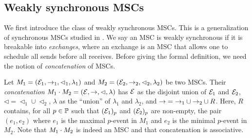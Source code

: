 




\subsection{Weakly synchronous MSCs}

We first introduce the class of weakly synchronous MSCs. This is a generalization of synchronous MSCs studied in \cite{DBLP:conf/cav/BouajjaniEJQ18, DBLP:conf/fossacs/GiustoLL20}. We say an MSC is weakly synchronous if it is breakable into \emph{exchanges}, where an exchange is an MSC that allows one to schedule all sends before all receives. Before giving the formal definition, we need the notion of \emph{concatenation} of MSCs.

Let $M_1 = (\mathcal{E}_1,\to_1,\lhd_1,\lambda_1)$ and
$M_2 = (\mathcal{E}_2,\to_2,\lhd_2,\lambda_2)$ be two MSCs.
Their \emph{concatenation} $M_1 \cdot M_2 = (\mathcal{E},\to,\lhd,\lambda)$ has $\mathcal{E}$ as the disjoint union of $\mathcal{E}_1$ and $\mathcal{E}_2$,
${\lhd}  = {\lhd_1} \cup {\lhd_2}$, $\lambda$ as the ``union'' of $\lambda_1$
and $\lambda_2$, and ${\to} = {\to_1} \cup {\to_2} \cup R$.
Here, $R$ contains, for all $p \in \mathbb{P}$ such that $(\mathcal{E}_1)_p$ and
$(\mathcal{E}_2)_p$ are non-empty, the pair $(e_1,e_2)$ where $e_1$ is the
maximal $p$-event in $M_1$ and $e_2$ is the minimal $p$-event in $M_2$.
Note that $M_1 \cdot M_2$ is indeed an MSC and that
concatenation is associative.

